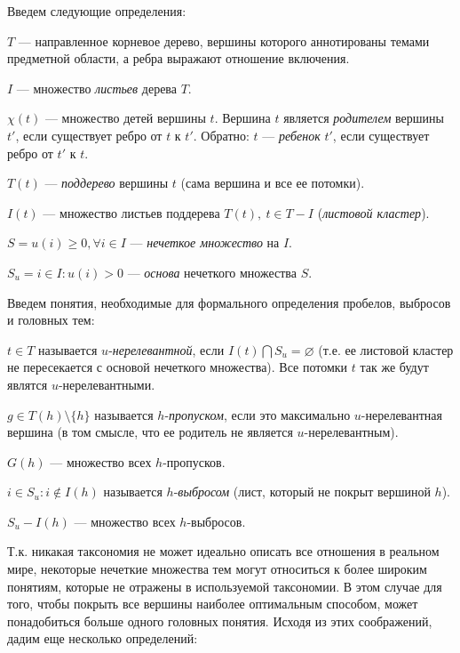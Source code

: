 \documentclass[12pt]{article}
\renewcommand{\emptyset}{\varnothing}
\newenvironment{itemize*}%
{\begin{itemize}%
	\setlength{\itemsep}{0pt}%
	\setlength{\parskip}{0pt}}%
{\end{itemize}}
\renewcommand{\cap}{\bigcap}
\begin{document}
Введем следующие определения:
\begin{itemize*}
	\item $T$ --- направленное корневое дерево, вершины которого аннотированы темами предметной области, а ребра выражают отношение включения.
	\item $I$ --- множество \textit{листьев} дерева $T$.
	\item $\chi(t)$ --- множество детей вершины $t$. Вершина $t$ является \textit{родителем} вершины $t'$, если существует ребро от $t$ к $t'$. Обратно: $t$ --- \textit{ребенок} $t'$, если существует ребро от $t'$ к $t$.
	\item $T(t)$ --- \textit{поддерево} вершины $t$ (сама вершина и все ее потомки).
	\item $I(t)$ --- множество листьев поддерева $T(t), \ t\in T-I$ (\textit{листовой кластер}).
	
	\item $S={u(i)\geq0,\forall i\in I}$ --- \textit{нечеткое множество} на $I$.
	\item $S_u={i\in I: u(i)>0}$ --- \textit{основа} нечеткого множества $S$.
\end{itemize*}

Введем понятия, необходимые для формального определения пробелов, выбросов и головных тем: 
\begin{itemize*}
	\item $t\in T$ называется $u$-\textit{нерелевантной}, если $I(t) \cap S_u=\emptyset$ (т.е. ее листовой кластер не пересекается с основой нечеткого множества).
	Все потомки $t$ так же будут являтся $u$-нерелевантными.
	\item $g\in T(h)\setminus\{h\}$ называется $h$-\textit{пропуском}, если это максимально $u$-нерелевантная вершина (в том смысле, что ее родитель не является $u$-нерелевантным). 
	\item $G(h)$ --- множество всех $h$-пропусков.
	\item $i\in S_u: i\notin I(h)$ называется $h$-\textit{выбросом} (лист, который не покрыт вершиной $h$).
	\item $S_u -I(h)$ --- множество всех $h$-выбросов.
\end{itemize*}

Т.к. никакая таксономия не может идеально описать все отношения в реальном мире, некоторые нечеткие множества тем могут относиться к более широким понятиям, которые не отражены в используемой таксономии. В этом случае для того, чтобы покрыть все вершины наиболее оптимальным способом, может понадобиться больше одного головных понятия. Исходя из этих соображений, дадим еще несколько определений:
\end{document}
